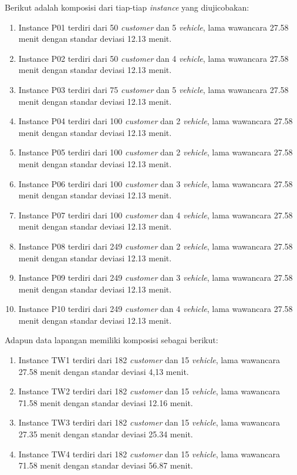 Berikut adalah komposisi dari tiap-tiap \textit{instance} yang diujicobakan:
\begin{enumerate}
	\item Instance P01 terdiri dari 50 \textit{customer} dan 5 \textit{vehicle}, lama wawancara 27.58 menit dengan standar deviasi 12.13 menit.
	\item Instance P02 terdiri dari 50 \textit{customer} dan 4 \textit{vehicle}, lama wawancara 27.58 menit dengan standar deviasi 12.13 menit.
	\item Instance P03 terdiri dari 75 \textit{customer} dan 5 \textit{vehicle}, lama wawancara 27.58 menit dengan standar deviasi 12.13 menit.
	\item Instance P04 terdiri dari 100 \textit{customer} dan 2 \textit{vehicle}, lama wawancara 27.58 menit dengan standar deviasi 12.13 menit.
	\item Instance P05 terdiri dari 100 \textit{customer} dan 2 \textit{vehicle}, lama wawancara 27.58 menit dengan standar deviasi 12.13 menit.
	\item Instance P06 terdiri dari 100 \textit{customer} dan 3 \textit{vehicle}, lama wawancara 27.58 menit dengan standar deviasi 12.13 menit.
	\item Instance P07 terdiri dari 100 \textit{customer} dan 4 \textit{vehicle}, lama wawancara 27.58 menit dengan standar deviasi 12.13 menit.
	\item Instance P08 terdiri dari 249 \textit{customer} dan 2 \textit{vehicle}, lama wawancara 27.58 menit dengan standar deviasi 12.13 menit.
	\item Instance P09 terdiri dari 249 \textit{customer} dan 3 \textit{vehicle}, lama wawancara 27.58 menit dengan standar deviasi 12.13 menit.
	\item Instance P10 terdiri dari 249 \textit{customer} dan 4 \textit{vehicle}, lama wawancara 27.58 menit dengan standar deviasi 12.13 menit.
\end{enumerate}
Adapun data lapangan memiliki komposisi sebagai berikut:
\begin{enumerate}
	\item Instance TW1 terdiri dari 182 \textit{customer} dan 15 \textit{vehicle}, lama wawancara 27.58 menit dengan standar deviasi 4,13 menit.
	\item Instance TW2 terdiri dari 182 \textit{customer} dan 15 \textit{vehicle}, lama wawancara 71.58 menit dengan standar deviasi 12.16 menit.
	\item Instance TW3 terdiri dari 182 \textit{customer} dan 15 \textit{vehicle}, lama wawancara 27.35 menit dengan standar deviasi 25.34 menit.
	\item Instance TW4 terdiri dari 182 \textit{customer} dan 15 \textit{vehicle}, lama wawancara 71.58 menit dengan standar deviasi 56.87 menit.
\end{enumerate}


